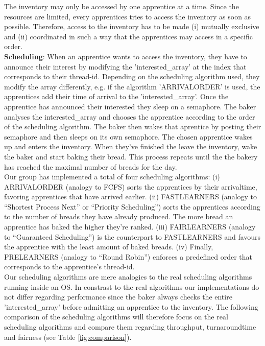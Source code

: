 \documentclass[11pt]{article}
\begin{document}
The inventory may only be accessed by one apprentice at a time. Since the resources are limited, every apprentices tries to access the inventory as soon as possible. Therefore, access to the inventory has to be made (i) mutually exclusive and (ii) coordinated in such a way that the apprentices may access in a specific order.\\

\textbf{Scheduling}: When an apprentice wants to access the inventory, they have to announce their interest by modifying the 'interested\_array' at the index that corresponds to their thread-id. Depending on the scheduling algorithm used, they modify the array differently, e.g. if the algorithm 'ARRIVALORDER' is used, the apprentices add their time of arrival to the 'interested\_array'. Once the apprentice has announced their interested they sleep on a semaphore. The baker analyses the interested\_array and chooses the apprentice according to the order of the scheduling algorithm. The baker then wakes that aprentice by posting their semaphore and then sleeps on its own semaphore. The chosen apprentice wakes up and enters the inventory. When they've finished the leave the inventory, wake the baker and start baking their bread. This process repeats until the the bakery has reached the maximal number of breads for the day.\\

Our group has implemented a total of four scheduling algorithms: (i) ARRIVALORDER (analogy to FCFS) sorts the apprentices by their arrivaltime, favoring apprentices that have arrived earlier. (ii) FASTLEARNERS (analogy to ``Shortest Process Next'' or ``Priority Scheduling'') sorts the apprentices according to the number of breads they have already produced. The more bread an apprentice has baked the higher they're ranked. (iii) FAIRLEARNERS (analogy to ``Guaranteed Scheduling'') is the counterpart to FASTLEARNERS and favours the apprentice with the least amount of baked breads. (iv) Finally, PRELEARNERS (analogy to ``Round Robin'') enforces a predefined order that corresponds to the apprentice's thread-id.\\

Our scheduling algorithms are mere analogies to the real scheduling algorithms running inside an OS. In constrast to the real algorithms our implementations do not differ regarding performance since the baker always checks the entire 'interested\_array' before admitting an apprentice to the inventory. The following comparison of the scheduling algorithms will therefore focus on the real scheduling algorithms and compare them regarding throughput, turnaroundtime and fairness (see Table \ref{fig:comparison}).\\
\end{document}
